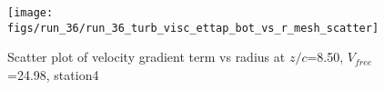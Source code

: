 \begin{figure}[H]
\centering
\texttt{[image: figs/run\_36/run\_36\_turb\_visc\_ettap\_bot\_vs\_r\_mesh\_scatter]}
\caption{Scatter plot of velocity gradient term vs radius at $z/c$=8.50, $V_{free}$=24.98, station4}
\label{fig:run_36_turb_visc_ettap_bot_vs_r_mesh_scatter}
\end{figure}


